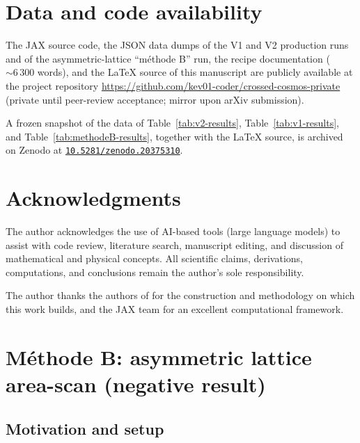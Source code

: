 \documentclass[11pt,a4paper]{article}
\theoremstyle{definition}
\begin{document}
\section*{Data and code availability}
\label{sec:code-data}

The JAX source code, the JSON data dumps of the V1 and V2 production
runs and of the asymmetric-lattice ``méthode B'' run, the recipe
documentation ($\sim 6\,300$ words), and the LaTeX source of this
manuscript are publicly available at the project repository
\url{https://github.com/kev01-coder/crossed-cosmos-private}
(private until peer-review acceptance; mirror upon arXiv submission).

A frozen snapshot of the data of Table~\ref{tab:v2-results},
Table~\ref{tab:v1-results}, and Table~\ref{tab:methodeB-results},
together with the LaTeX source, is archived on Zenodo at
\href{https://doi.org/10.5281/zenodo.20375310}{\nolinkurl{10.5281/zenodo.20375310}}.

\section*{Acknowledgments}

The author acknowledges the use of AI-based tools (large language
models) to assist with code review, literature search, manuscript
editing, and discussion of mathematical and physical concepts. All
scientific claims, derivations, computations, and conclusions remain
the author's sole responsibility.

The author thanks the authors of \cite{BP2008b,Rabenstein2019,
Rindlisbacher2022} for the construction and methodology on which
this work builds, and the JAX team for an excellent computational
framework.

\appendix

\section{Méthode B: asymmetric lattice area-scan (negative result)}
\label{app:methodeB}

\subsection{Motivation and setup}
\end{document}
